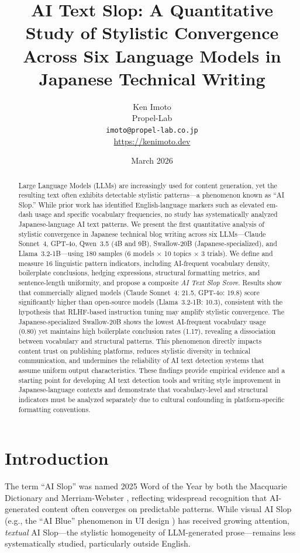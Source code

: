 \documentclass[11pt,a4paper]{article}
\title{AI Text Slop: A Quantitative Study of Stylistic Convergence Across Six Language Models in Japanese Technical Writing}
\author{Ken Imoto\\
Propel-Lab\\
\texttt{imoto@propel-lab.co.jp}\\
\url{https://kenimoto.dev}}
\date{March 2026}
\begin{document}
\maketitle

\begin{abstract}
Large Language Models (LLMs) are increasingly used for content generation, yet the resulting text often exhibits detectable stylistic patterns---a phenomenon known as ``AI Slop.''
While prior work has identified English-language markers such as elevated em-dash usage and specific vocabulary frequencies, no study has systematically analyzed Japanese-language AI text patterns.
We present the first quantitative analysis of stylistic convergence in Japanese technical blog writing across six LLMs---Claude Sonnet~4, GPT-4o, Qwen~3.5 (4B and 9B), Swallow-20B (Japanese-specialized), and Llama~3.2-1B---using 180 samples (6 models $\times$ 10 topics $\times$ 3 trials).
We define and measure 16 linguistic pattern indicators, including AI-frequent vocabulary density, boilerplate conclusions, hedging expressions, structural formatting metrics, and sentence-length uniformity, and propose a composite \textit{AI Text Slop Score}.
Results show that commercially aligned models (Claude Sonnet~4: 21.5, GPT-4o: 19.8) score significantly higher than open-source models (Llama~3.2-1B: 10.3), consistent with the hypothesis that RLHF-based instruction tuning may amplify stylistic convergence.
The Japanese-specialized Swallow-20B shows the lowest AI-frequent vocabulary usage (0.80) yet maintains high boilerplate conclusion rates (1.17), revealing a dissociation between vocabulary and structural patterns.
This phenomenon directly impacts content trust on publishing platforms, reduces stylistic diversity in technical communication, and undermines the reliability of AI text detection systems that assume uniform output characteristics.
These findings provide empirical evidence and a starting point for developing AI text detection tools and writing style improvement in Japanese-language contexts and demonstrate that vocabulary-level and structural indicators must be analyzed separately due to cultural confounding in platform-specific formatting conventions.
\end{abstract}

\section{Introduction}

The term ``AI Slop'' was named 2025 Word of the Year by both the Macquarie Dictionary and Merriam-Webster \cite{macquarie2025}, reflecting widespread recognition that AI-generated content often converges on predictable patterns. While visual AI Slop (e.g., the ``AI Blue'' phenomenon in UI design \cite{imoto2026aiblue}) has received growing attention, \textit{textual} AI Slop---the stylistic homogeneity of LLM-generated prose---remains less systematically studied, particularly outside English.
\end{document}

